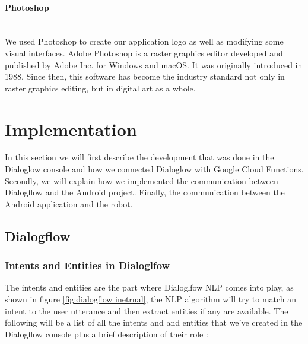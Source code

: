 \paragraph{Photoshop}~\\
We used Photoshop to create our application logo as well as modifying some visual interfaces. Adobe Photoshop is a raster graphics editor developed and published by Adobe Inc. for Windows and macOS. It was originally introduced in 1988. Since then, this software has become the industry standard not only in raster graphics editing, but in digital art as a whole.


\section{Implementation}
In this section we will first describe the development that was done in the Dialoglow console and how we connected Dialoglow with Google Cloud Functions. Secondly, we will explain how we implemented the communication between Dialogflow and the Android project. Finally, the communication between the Android application and the robot.
\subsection{Dialogflow}
\subsubsection{Intents and Entities in Dialoglfow}
The intents and entities are the part where Dialoglfow NLP comes into play, as shown in figure \ref{fig:dialogflow inetrnal}, the NLP algorithm will try to match an intent to the user utterance and then extract entities if any are available. The following will be a list of all the intents and and entities that we've created in the Dialogflow console plus a brief description of their role : 

